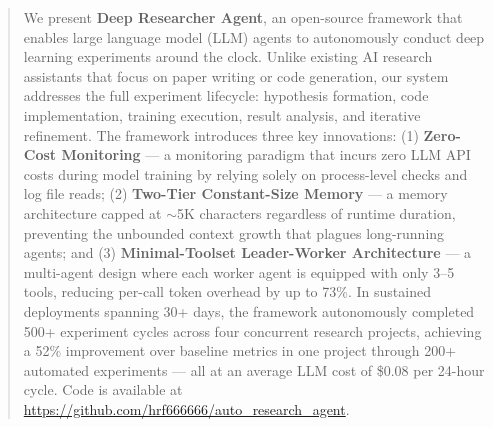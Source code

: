 \begin{abstract}
We present \textbf{Deep Researcher Agent}, an open-source framework that enables large language model (LLM) agents to autonomously conduct deep learning experiments around the clock. Unlike existing AI research assistants that focus on paper writing or code generation, our system addresses the full experiment lifecycle: hypothesis formation, code implementation, training execution, result analysis, and iterative refinement. The framework introduces three key innovations: (1) \textbf{Zero-Cost Monitoring} --- a monitoring paradigm that incurs zero LLM API costs during model training by relying solely on process-level checks and log file reads; (2) \textbf{Two-Tier Constant-Size Memory} --- a memory architecture capped at $\sim$5K characters regardless of runtime duration, preventing the unbounded context growth that plagues long-running agents; and (3) \textbf{Minimal-Toolset Leader-Worker Architecture} --- a multi-agent design where each worker agent is equipped with only 3--5 tools, reducing per-call token overhead by up to 73\%. In sustained deployments spanning 30+ days, the framework autonomously completed 500+ experiment cycles across four concurrent research projects, achieving a 52\% improvement over baseline metrics in one project through 200+ automated experiments --- all at an average LLM cost of \$0.08 per 24-hour cycle. Code is available at \url{https://github.com/hrf666666/auto_research_agent}.
\end{abstract}
